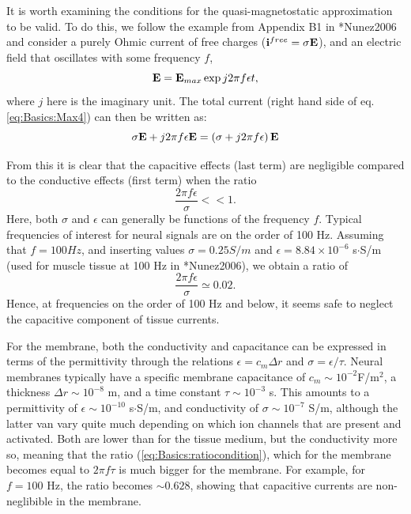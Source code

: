 It is worth examining the conditions for the quasi-magnetostatic approximation to be valid. To do this, we follow the example from Appendix B1 in \citeasnoun**{Nunez2006} and consider a purely Ohmic current of free charges (${\bf i}^{free} = \sigma {\bf E}$), and an electric field that oscillates with some frequency $f$, 
\begin{equation}
{\bf E} = {\bf E}_{max} \exp{j2\pi f \epsilon t}, 
\label{eq:Basics:Ecomponent}
\end{equation}
where $j$ here is the imaginary unit. The total current (right hand side of eq. \ref{eq:Basics:Max4}) can then be written as:
\begin{equation}
\sigma{\bf E} +  j 2 \pi f \epsilon {\bf E} = \left( \sigma + j 2 \pi f \epsilon \right){\bf E}
\label{eq:Basics:Max4dot2}
\end{equation}

From this it is clear that the capacitive effects (last term) are negligible compared to the conductive effects (first term) when the ratio
\begin{equation}
\frac{2 \pi f \epsilon}{\sigma} << 1. 
\label{eq:Basics:ratiocondition}
\end{equation}
Here, both $\sigma$ and $\epsilon$ can generally be functions of the frequency $f$. Typical frequencies of interest for neural signals are on the order of 100 Hz. Assuming that $f = 100 Hz$, and inserting values $\sigma = 0.25 S/m$ and $\epsilon = 8.84 \times 10^{-6}$ s$\cdot$S/m (used for muscle tissue at 100 Hz in  \citeasnoun**{Nunez2006}), we obtain a ratio of 
\begin{equation}
\frac{2 \pi f \epsilon}{\sigma} \simeq 0.02. 
\label{eq:Basics:ratiovalue}
\end{equation}
Hence, at frequencies on the order of 100 Hz and below, it seems safe to neglect the capacitive component of tissue currents. 

For the membrane, both the conductivity and capacitance can be expressed in terms of the permittivity through the relations $\epsilon = c_m \Delta r$ and $\sigma = \epsilon / \tau$. Neural membranes typically have a specific membrane capacitance of $c_m \sim 10^{-2} $F/m$^2$, a thickness $\Delta r \sim 10^{-8}$ m, and a time constant $\tau \sim 10^{-3}$ s. This amounts to a permittivity of $\epsilon \sim 10^{-10}$ s$\cdot$S/m, and conductivity of $\sigma \sim 10^{-7}$ S/m, although the latter van vary quite much depending on which ion channels that are present and activated. Both are lower than for the tissue medium, but the conductivity more so, meaning that the ratio (\ref{eq:Basics:ratiocondition}), which for the membrane becomes equal to $2\pi f \tau$ is much bigger for the membrane. For example, for $f = 100$ Hz, the ratio becomes $\sim 0.628$, showing that capacitive currents are non-neglibible in the membrane. 

